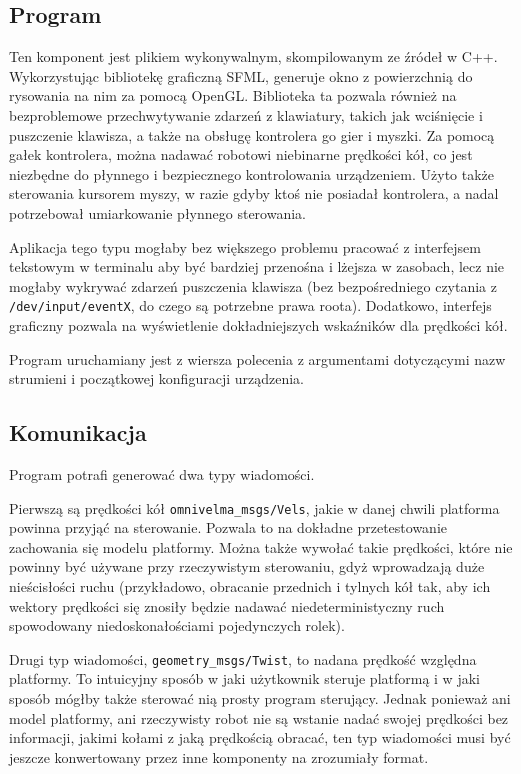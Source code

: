 	\subsection{Program}
		Ten komponent jest plikiem wykonywalnym, skompilowanym ze źródeł w C++.
		Wykorzystując bibliotekę graficzną SFML, generuje okno z powierzchnią do rysowania na nim za pomocą OpenGL.
		Biblioteka ta pozwala również na bezproblemowe przechwytywanie zdarzeń z klawiatury, takich jak wciśnięcie i puszczenie klawisza, a także na obsługę kontrolera go gier i myszki.
		Za pomocą gałek kontrolera, można nadawać robotowi niebinarne prędkości kół, co jest niezbędne do płynnego i bezpiecznego kontrolowania urządzeniem.
		Użyto także sterowania kursorem myszy, w razie gdyby ktoś nie posiadał kontrolera, a nadal potrzebował umiarkowanie płynnego sterowania.
		
		Aplikacja tego typu mogłaby bez większego problemu pracować z interfejsem tekstowym w terminalu aby być bardziej przenośna i lżejsza w zasobach, 
		lecz nie mogłaby wykrywać zdarzeń puszczenia klawisza
		(bez bezpośredniego czytania z \texttt{/dev/input/eventX}, do czego są potrzebne prawa roota). 
		Dodatkowo, interfejs graficzny pozwala na wyświetlenie dokładniejszych wskaźników dla prędkości kół.
		
		Program uruchamiany jest z wiersza polecenia z argumentami dotyczącymi nazw strumieni i początkowej konfiguracji urządzenia.
	
	\subsection{Komunikacja}
		Program potrafi generować dwa typy wiadomości.
		
		Pierwszą są prędkości kół \texttt{omnivelma\_msgs/Vels}, jakie w danej chwili platforma powinna przyjąć na sterowanie.
		Pozwala to na dokładne przetestowanie zachowania się modelu platformy.
		Można także wywołać takie prędkości, które nie powinny być używane przy rzeczywistym sterowaniu, gdyż wprowadzają duże nieścisłości ruchu 
		(przykładowo, obracanie przednich i tylnych kół tak, aby ich wektory prędkości się znosiły będzie nadawać niedeterministyczny ruch spowodowany niedoskonałościami
		pojedynczych rolek).
		
		Drugi typ wiadomości, \texttt{geometry\_msgs/Twist}, to nadana prędkość względna platformy.
		To intuicyjny sposób w jaki użytkownik steruje platformą i w jaki sposób mógłby także sterować nią prosty program sterujący.
		Jednak ponieważ ani model platformy, ani rzeczywisty robot nie są wstanie nadać swojej prędkości bez informacji, jakimi kołami z jaką prędkością obracać,
		ten typ wiadomości musi być jeszcze konwertowany przez inne komponenty na zrozumiały format.
		
